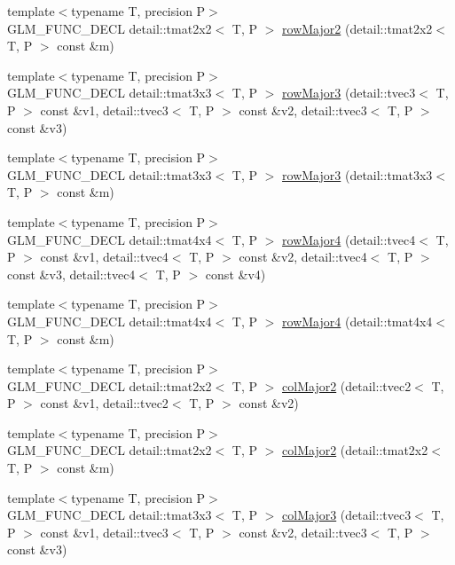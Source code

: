 \begin{CompactItemize}
\item 
{\footnotesize template$<$typename T, precision P$>$ }\\GLM\_\-FUNC\_\-DECL detail::tmat2x2$<$ T, P $>$ \hyperlink{group__gtx__matrix__major__storage_g9712bed19f3aa3776b59756adf3b56e2}{rowMajor2} (detail::tmat2x2$<$ T, P $>$ const \&m)
\item 
{\footnotesize template$<$typename T, precision P$>$ }\\GLM\_\-FUNC\_\-DECL detail::tmat3x3$<$ T, P $>$ \hyperlink{group__gtx__matrix__major__storage_g3839659b9641777b1bbc98122efc1320}{rowMajor3} (detail::tvec3$<$ T, P $>$ const \&v1, detail::tvec3$<$ T, P $>$ const \&v2, detail::tvec3$<$ T, P $>$ const \&v3)
\item 
{\footnotesize template$<$typename T, precision P$>$ }\\GLM\_\-FUNC\_\-DECL detail::tmat3x3$<$ T, P $>$ \hyperlink{group__gtx__matrix__major__storage_g292c13103d16ead7193def8fcbcfa9fb}{rowMajor3} (detail::tmat3x3$<$ T, P $>$ const \&m)
\item 
{\footnotesize template$<$typename T, precision P$>$ }\\GLM\_\-FUNC\_\-DECL detail::tmat4x4$<$ T, P $>$ \hyperlink{group__gtx__matrix__major__storage_g8d22c54daf5c593c1285c54d1439eead}{rowMajor4} (detail::tvec4$<$ T, P $>$ const \&v1, detail::tvec4$<$ T, P $>$ const \&v2, detail::tvec4$<$ T, P $>$ const \&v3, detail::tvec4$<$ T, P $>$ const \&v4)
\item 
{\footnotesize template$<$typename T, precision P$>$ }\\GLM\_\-FUNC\_\-DECL detail::tmat4x4$<$ T, P $>$ \hyperlink{group__gtx__matrix__major__storage_g77df85015848f4812005392d9c78b8a4}{rowMajor4} (detail::tmat4x4$<$ T, P $>$ const \&m)
\item 
{\footnotesize template$<$typename T, precision P$>$ }\\GLM\_\-FUNC\_\-DECL detail::tmat2x2$<$ T, P $>$ \hyperlink{group__gtx__matrix__major__storage_g3e3ecc119e43821d7ac582124ef891cb}{colMajor2} (detail::tvec2$<$ T, P $>$ const \&v1, detail::tvec2$<$ T, P $>$ const \&v2)
\item 
{\footnotesize template$<$typename T, precision P$>$ }\\GLM\_\-FUNC\_\-DECL detail::tmat2x2$<$ T, P $>$ \hyperlink{group__gtx__matrix__major__storage_g095b6bfd85a85c3a0878b86363e3d0aa}{colMajor2} (detail::tmat2x2$<$ T, P $>$ const \&m)
\item 
{\footnotesize template$<$typename T, precision P$>$ }\\GLM\_\-FUNC\_\-DECL detail::tmat3x3$<$ T, P $>$ \hyperlink{group__gtx__matrix__major__storage_gfa499e4dd0fe76587feea1f3ad8dcfef}{colMajor3} (detail::tvec3$<$ T, P $>$ const \&v1, detail::tvec3$<$ T, P $>$ const \&v2, detail::tvec3$<$ T, P $>$ const \&v3)

\end{CompactItemize}
